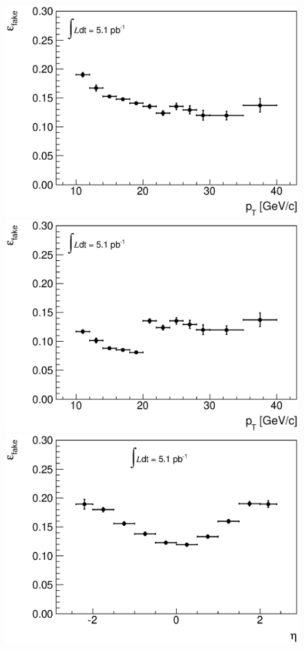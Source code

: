 \begin{figure}[!htbp]
\begin{center}
\includegraphics[scale=0.33]{figures/frpt_old.eps}
\includegraphics[scale=0.33]{figures/frpt_new.eps} \\
\includegraphics[scale=0.33]{figures/freta_old.eps}

\end{center}
\end{figure}
